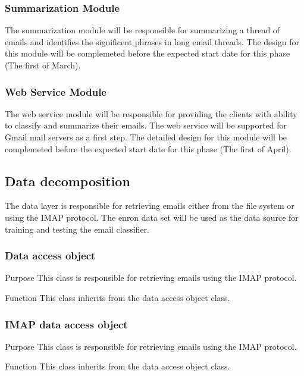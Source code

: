 \documentclass[12pt]{article}
\newenvironment{my_desc}
{\begin{description}
  \setlength{\itemsep}{0cm}
  \setlength{\parskip}{0cm}}
{\end{description}}
\begin{document}
\subsubsection{Summarization Module}
The summarization module will be responsible for summarizing a thread of emails and identifies the significent phrases in long email threads. The design for this module will be complemeted before the expected start date for this phase (The first of March).

\subsubsection{Web Service Module}
The web service module will be responsible for providing the clients with ability to classify and summarize their emails. The web service will be supported for Gmail mail servers as a first step. The detailed design for this module will be complemeted before the expected start date for this phase (The first of April).

\subsection{Data decomposition}
The data layer is responsible for retrieving emails either from the file system or using the IMAP protocol. The enron data set will be used as the data source for training and testing the email classifier.

\subsubsection{Data access object}
  \begin{my_desc}
   \item[Purpose] This class is responsible for retrieving emails using the IMAP protocol.
   \item[Function] This class inherits from the data access object class.
  \end{my_desc}

\subsubsection{IMAP data access object}
  \begin{my_desc}
   \item[Purpose] This class is responsible for retrieving emails using the IMAP protocol.
   \item[Function] This class inherits from the data access object class.
  \end{my_desc}
\end{document}
